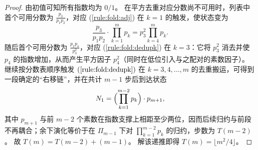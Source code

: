 \begin{proof}
由初值可知所有指数均为 \(0/1\)。
在平方去重对应分数尚不可用时，列表中首个可用分数为 \(\frac{p_3}{p_1p_2}\)，对应 (\ref{rule:fold:adj}) 在 \(k=1\) 的触发，使状态变为
\[
\frac{p_3}{p_1p_2}\cdot \prod_{k=1}^{m} p_k= p_3^2\prod_{k=4}^{m} p_k.
\]
随后首个可用分数为 \(\frac{p_1p_4}{p_3^2}\)，对应 (\ref{rule:fold:dedupk}) 在 \(k=3\)：它将 \(p_3^2\) 消去并使 \(p_4\) 的指数增加，从而产生平方因子 \(p_4^2\)（同时在低位引入与之配对的素数因子）。
继续按分数表顺序触发 \((\ref{rule:fold:dedupk})\) 在 \(k=3,4,\dots,m\) 的去重搬运，可得到一段确定的“右移链”，并在共计 \(m-1\) 步后到达状态
\[
N_1=\Bigl(\prod_{k=1}^{m-2}p_k\Bigr)\cdot p_{m+1},
\]
其中 \(p_{m+1}\) 与前 \(m-2\) 个素数在指数支撑上相距至少两位，因而后续归约与前段不再耦合；余下演化等价于在 \(\Pi_{m-1}\) 下对 \(\prod_{k=1}^{m-2}p_k\) 的归约，步数为 \(T(m-2)\)。
故 \(T(m)=T(m-2)+(m-1)\)。
解该递推即得 \(T(m)=\lfloor m^2/4\rfloor\)。
\end{proof}

\endinput
